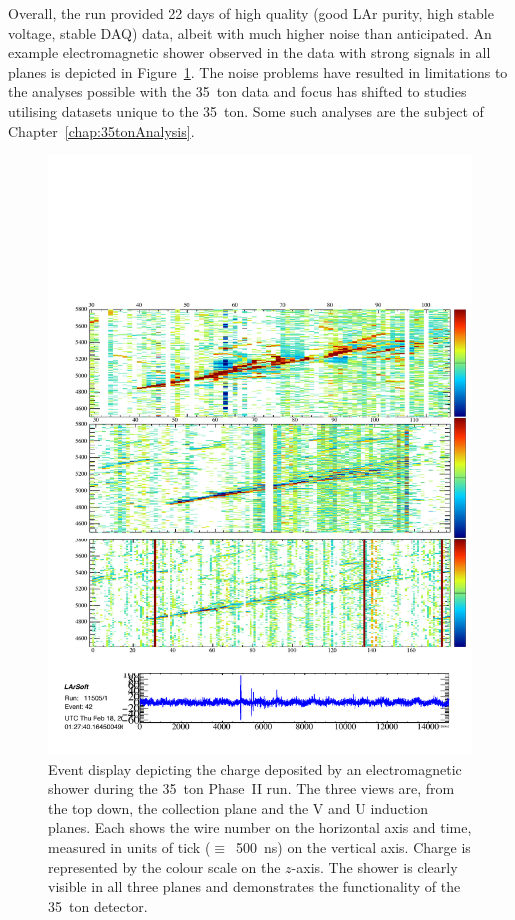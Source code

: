 Overall, the run provided 22 days of high quality (good LAr purity, high stable voltage, stable DAQ) data, albeit with much higher noise than anticipated.  An example electromagnetic shower observed in the data with strong signals in all planes is depicted in Figure~\ref{fig:FamousShower}.  The noise problems have resulted in limitations to the analyses possible with the 35~ton data and focus has shifted to studies utilising datasets unique to the 35~ton.  Some such analyses are the subject of Chapter~\ref{chap:35tonAnalysis}.

\begin{figure}
  \centering
  \includegraphics[width=12cm]{FamousShower.pdf}
  \caption[Event display depicting the charge deposited by an electromagnetic shower during the 35~ton Phase~II run.]{Event display depicting the charge deposited by an electromagnetic shower during the 35~ton Phase~II run.  The three views are, from the top down, the collection plane and the V and U induction planes.  Each shows the wire number on the horizontal axis and time, measured in units of tick ($\equiv$~500~ns) on the vertical axis.  Charge is represented by the colour scale on the $z$-axis.  The shower is clearly visible in all three planes and demonstrates the functionality of the 35~ton detector.}
  \label{fig:FamousShower}
\end{figure}

